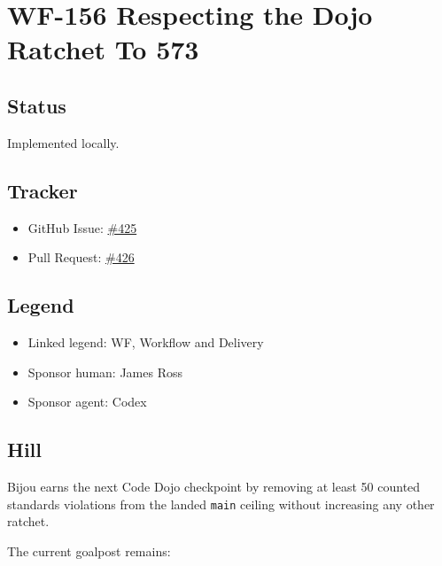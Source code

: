 \chapter{WF-156 Respecting the Dojo Ratchet To 573}\label{record-238}

\smallskip

\section{Status}\label{record-238-status}

Implemented locally.

\section{Tracker}\label{record-238-tracker}

\begin{itemize}
\tightlist
\item
  GitHub Issue: \href{https://github.com/flyingrobots/bijou/issues/425}{\#425}
\item
  Pull Request: \href{https://github.com/flyingrobots/bijou/pull/426}{\#426}
\end{itemize}

\section{Legend}\label{record-238-legend}

\begin{itemize}
\tightlist
\item
  Linked legend: WF, Workflow and Delivery
\item
  Sponsor human: James Ross
\item
  Sponsor agent: Codex
\end{itemize}

\section{Hill}\label{record-238-hill}

Bijou earns the next Code Dojo checkpoint by removing at least 50 counted standards violations from the landed \texttt{m\allowbreak{}a\allowbreak{}i\allowbreak{}n} ceiling without increasing any other ratchet.

The current goalpost remains:

